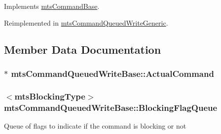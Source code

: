 Implements \hyperlink{classmts_command_base_a0885ce7a5321d7b672694ade780b9d64}{mts\+Command\+Base}.



Reimplemented in \hyperlink{classmts_command_queued_write_generic_a08ecb69cf7b48addc3ac1c2c00749862}{mts\+Command\+Queued\+Write\+Generic}.



\subsection{Member Data Documentation}
\hypertarget{classmts_command_queued_write_base_a0b7c5cdfff1c742e84796cf3f80bbd68}{}
\subsubsection[{Actual\+Command}]{$\ast$ mts\+Command\+Queued\+Write\+Base\+::\+Actual\+Command\hspace{0.3cm}{\ttfamily [protected]}}\label{classmts_command_queued_write_base_a0b7c5cdfff1c742e84796cf3f80bbd68}
\hypertarget{classmts_command_queued_write_base_a8aba2d8465fe58370e4058b9b4998621}{}
\subsubsection[{Blocking\+Flag\+Queue}]{$<${\bf mts\+Blocking\+Type}$>$ mts\+Command\+Queued\+Write\+Base\+::\+Blocking\+Flag\+Queue\hspace{0.3cm}{\ttfamily [protected]}}\label{classmts_command_queued_write_base_a8aba2d8465fe58370e4058b9b4998621}
Queue of flags to indicate if the command is blocking or not \hypertarget{classmts_command_queued_write_base_a67c11afa021916f995d1d537312c9a4c}{}
